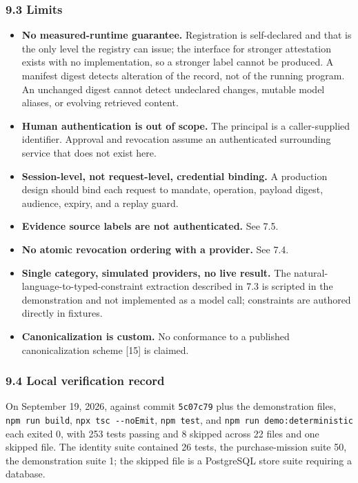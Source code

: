 \documentclass[
  11pt,
  letterpaper,
]{article}
\providecommand{\tightlist}{%
  \setlength{\itemsep}{0pt}\setlength{\parskip}{0pt}}
\begin{document}
\subsubsection{9.3 Limits}\label{limits}

\begin{itemize}
\tightlist
\item
  \textbf{No measured-runtime guarantee.} Registration is self-declared
  and that is the only level the registry can issue; the interface for
  stronger attestation exists with no implementation, so a stronger
  label cannot be produced. A manifest digest detects alteration of the
  record, not of the running program. An unchanged digest cannot detect
  undeclared changes, mutable model aliases, or evolving retrieved
  content.
\item
  \textbf{Human authentication is out of scope.} The principal is a
  caller-supplied identifier. Approval and revocation assume an
  authenticated surrounding service that does not exist here.
\item
  \textbf{Session-level, not request-level, credential binding.} A
  production design should bind each request to mandate, operation,
  payload digest, audience, expiry, and a replay guard.
\item
  \textbf{Evidence source labels are not authenticated.} See 7.5.
\item
  \textbf{No atomic revocation ordering with a provider.} See 7.4.
\item
  \textbf{Single category, simulated providers, no live result.} The
  natural-language-to-typed-constraint extraction described in 7.3 is
  scripted in the demonstration and not implemented as a model call;
  constraints are authored directly in fixtures.
\item
  \textbf{Canonicalization is custom.} No conformance to a published
  canonicalization scheme {[}15{]} is claimed.
\end{itemize}

\subsubsection{9.4 Local verification
record}\label{local-verification-record}

On September 19, 2026, against commit \texttt{5c07c79} plus the
demonstration files, \texttt{npm\ run\ build},
\texttt{npx\ tsc\ -\/-noEmit}, \texttt{npm\ test}, and
\texttt{npm\ run\ demo:deterministic} each exited 0, with 253 tests
passing and 8 skipped across 22 files and one skipped file. The identity
suite contained 26 tests, the purchase-mission suite 50, the
demonstration suite 1; the skipped file is a PostgreSQL store suite
requiring a database.
\end{document}
